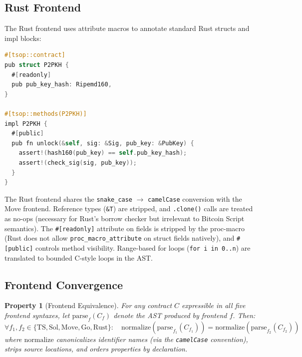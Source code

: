 \documentclass[11pt,a4paper]{article}
\newtheorem{property}[theorem]{Property}
\begin{document}
\subsection{Rust Frontend}
\label{sec:frontend-rs}

The Rust frontend uses attribute macros to annotate standard Rust structs and
impl blocks:

\begin{lstlisting}[style=tsop,language=C,
  morekeywords={pub,struct,impl,fn,let,mut,self,use}]
#[tsop::contract]
pub struct P2PKH {
  #[readonly]
  pub pub_key_hash: Ripemd160,
}

#[tsop::methods(P2PKH)]
impl P2PKH {
  #[public]
  pub fn unlock(&self, sig: &Sig, pub_key: &PubKey) {
    assert!(hash160(pub_key) == self.pub_key_hash);
    assert!(check_sig(sig, pub_key));
  }
}
\end{lstlisting}

The Rust frontend shares the \texttt{snake\_case} $\to$ \texttt{camelCase}
conversion with the Move frontend. Reference types (\texttt{\&T}) are
stripped, and \texttt{.clone()} calls are treated as no-ops (necessary for
Rust's borrow checker but irrelevant to Bitcoin Script semantics).
The \texttt{\#[readonly]} attribute on fields is stripped by the proc-macro
(Rust does not allow \texttt{proc\_macro\_attribute} on struct fields
natively), and \texttt{\#[public]} controls method visibility.
Range-based for loops (\texttt{for i in 0..n}) are translated to
bounded C-style loops in the AST.

\subsection{Frontend Convergence}
\label{sec:convergence}

\begin{property}[Frontend Equivalence]
\label{prop:frontend-equiv}
For any contract $C$ expressible in all five frontend syntaxes, let
$\text{parse}_f(C_f)$ denote the AST produced by frontend $f$. Then:
\[
  \forall f_1, f_2 \in \{\text{TS}, \text{Sol}, \text{Move}, \text{Go}, \text{Rust}\}:
  \quad \text{normalize}(\text{parse}_{f_1}(C_{f_1})) = \text{normalize}(\text{parse}_{f_2}(C_{f_2}))
\]
where $\text{normalize}$ canonicalizes identifier names (via the
\texttt{camelCase} convention), strips source locations, and orders
properties by declaration.
\end{property}
\end{document}
